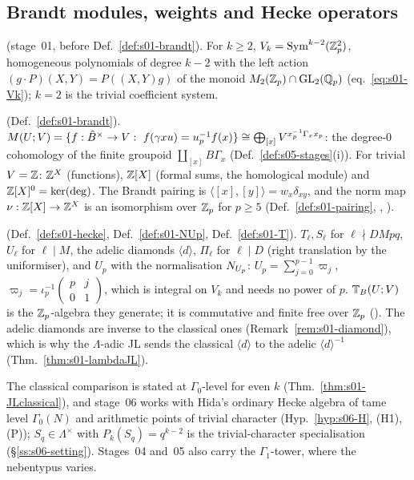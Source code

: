 \subsection{Brandt modules, weights and Hecke operators}\label{ss:s00-brandt}
\begin{description}[leftmargin=0pt,itemsep=3pt]
\item[Weights] (stage~01, before Def.~\ref{def:s01-brandt}). For $k\ge2$, $V_k=\mathrm{Sym}^{k-2}(\mathbb{Z}_p^2)$, homogeneous polynomials of degree $k-2$ with the left action
  $(g\cdot P)(X,Y)=P((X,Y)g)$ of the monoid $M_2(\mathbb{Z}_p)\cap\mathrm{GL}_2(\mathbb{Q}_p)$ (eq.~\eqref{eq:s01-Vk}); $k=2$ is the trivial coefficient system.
\item[Brandt modules] (Def.~\ref{def:s01-brandt}). $M(U;V)=\{f:\hat B^\times\to V:\ f(\gamma xu)=u_p^{-1}f(x)\}\cong\bigoplus_{[x]}V^{x_p^{-1}\Gamma_xx_p}$:
  the degree-$0$ cohomology of the finite groupoid $\coprod_{[x]}B\Gamma_x$ (Def.~\ref{def:s05-stages}(i)). For trivial $V=\mathbb{Z}$:
  $\mathbb{Z}^X$ (functions), $\mathbb{Z}[X]$ (formal sums, the homological module) and $\mathbb{Z}[X]^0=\ker(\deg)$. The Brandt pairing is
  $\langle[x],[y]\rangle=w_x\delta_{xy}$, and the norm map $\nu:\mathbb{Z}[X]\to\mathbb{Z}^X$ is an isomorphism over $\mathbb{Z}_p$ for $p\ge5$
  (Def.~\ref{def:s01-pairing}, \stproved, \stformal).
\item[Hecke operators] (Def.~\ref{def:s01-hecke}, Def.~\ref{def:s01-NUp}, Def.~\ref{def:s01-T}). $T_\ell,S_\ell$ for $\ell\nmid DMpq$, $U_\ell$
  for $\ell\mid M$, the adelic diamonds $\langle d\rangle$, $\Pi_\ell$ for $\ell\mid D$ (right translation by the uniformiser), and $U_p$
  with the normalisation $N_{U_p}$: $U_p=\sum_{j=0}^{p-1}\varpi_j$, $\varpi_j=\iota_p^{-1}\left(\begin{smallmatrix}p&j\\0&1\end{smallmatrix}\right)$, which
  is integral on $V_k$ and needs no power of $p$. $\mathbb{T}_B(U;V)$ is the $\mathbb{Z}_p$-algebra they generate; it is commutative and finite free
  over $\mathbb{Z}_p$ (\stproved). The adelic diamonds are inverse to the classical ones (Remark~\ref{rem:s01-diamond}), which is why the
  $\Lambda$-adic JL sends the classical $\langle d\rangle$ to the adelic $\langle d\rangle^{-1}$ (Thm.~\ref{thm:s01-lambdaJL}).
\item[Trivial character] The classical comparison is stated at $\Gamma_0$-level for even $k$ (Thm.~\ref{thm:s01-JLclassical}), and
  stage~06 works with Hida's ordinary Hecke algebra of tame level $\Gamma_0(N)$ and arithmetic points of trivial character
  (Hyp.~\ref{hyp:s06-H}, (H1), (P)); $S_q\in\Lambda^\times$ with $P_k(S_q)=q^{k-2}$ is the trivial-character specialisation
  (\S\ref{ss:s06-setting}). Stages~04 and~05 also carry the $\Gamma_1$-tower, where the nebentypus varies.
\end{description}


